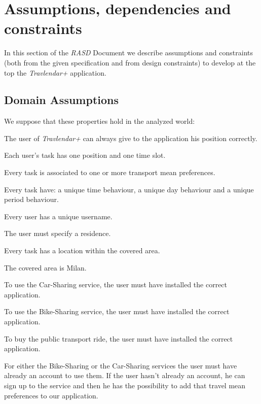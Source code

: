 \section{Assumptions, dependencies and constraints}
In this section of the \emph{RASD} Document we describe assumptions and constraints (both from the given specification and from design constraints) to develop at the top the \emph{Travlendar+} application.

\subsection{Domain Assumptions}
We suppose that these properties hold in the analyzed world:
\begin{domainList}

\item The user of \emph{Travlendar+} can always give to the application his position correctly.

\item Each user's task has one position and one time slot.

\item Every task is associated to one or more transport mean preferences.

\item Every task have: a unique time behaviour, a unique day behaviour and a unique period behaviour.

\item Every user has a unique username.

\item The user must specify a residence.

\item Every task has a location within the covered area.

\item The covered area is Milan.

\item To use the Car-Sharing service, the user must have installed the correct application.

\item To use the Bike-Sharing service, the user must have installed the correct application.

\item To buy the public transport ride, the user must have installed the correct application.

\item For either the Bike-Sharing or the Car-Sharing services the user must have already an account to use them. If the user hasn't already an account, he can sign up to the service and then he has the possibility to add that travel mean preferences to our application.


\end{domainList}
